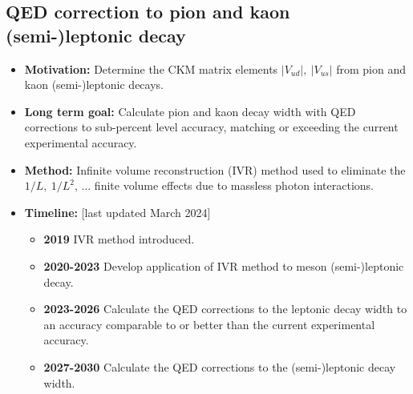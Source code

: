 \documentclass[12pt,hyperpdf]{article}
\begin{document}
\subsection{QED correction to pion and kaon (semi-)leptonic decay}
\begin{itemize}
    \item{\bf Motivation:} Determine the CKM matrix elements $|V_{ud}|,~|V_{us}|$ from pion and kaon (semi-)leptonic decays.
    \item{\bf Long term goal:} Calculate pion and kaon decay width with QED corrections to sub-percent level accuracy, matching or exceeding the current experimental accuracy.
    \item{\bf Method:}
      Infinite volume reconstruction (IVR) method \cite{Christ:2023lcc, Christ:2024xzj} used to eliminate
      the $1/L,~1/L^2,\,\dots$ finite volume effects due to massless photon interactions.
\item{\bf Timeline:} \hfill [last updated March 2024]
\begin{itemize}
    \item{\bf 2019} IVR method introduced.
    \item{\bf 2020-2023} Develop application of IVR method to meson (semi-)leptonic decay.
    \item{\bf 2023-2026} Calculate the QED corrections to the leptonic decay width to an accuracy comparable to or better than the current experimental accuracy.
    \item{\bf 2027-2030} Calculate the QED corrections to the (semi-)leptonic decay width.
\end{itemize}
\end{itemize}


\end{document}
